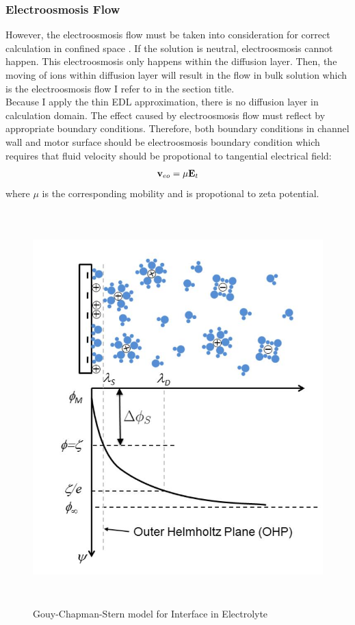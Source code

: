\documentclass[fontsize=11pt, %
                             paper=a4, %
                             twoside, %
                             captions=tableheading,
                             index=totoc,
                             hyperref]{labbook}
\begin{document}
\begin{addmargin}[4cm]{0cm}
\subsubsection{Electroosmosis Flow}
However, the electroosmosis flow must be taken into consideration for correct calculation in confined space \cite{ChiangVelegol2014}. If the solution is neutral, electroosmosis cannot happen. This electroosmosis only happens within the diffusion layer. Then, the moving of ions within diffusion layer will result in the flow in bulk solution which is the electroosmosis flow I refer to in the section title. \\
Because I apply the thin EDL approximation, there is no diffusion layer in calculation domain. The effect caused by electroosmosis flow must reflect by appropriate boundary conditions. Therefore, both boundary conditions in channel wall and motor surface should be electroosmosis boundary condition which requires that fluid velocity should be propotional to tangential electrical field:
\begin{equation}
\mathbf{v}_{eo}=\mu \mathbf{E}_t
\end{equation}
where $\mu$ is the corresponding mobility and is propotional to zeta potential.
\begin{figure}
\centering
\includegraphics[width=\linewidth, height=6in]{2016-11-13-Interface.jpg}
\caption{Gouy-Chapman-Stern model for Interface in Electrolyte}\label{2016-11-13-GCSMFIIE}
\end{figure}


\end{addmargin}
\end{document}
